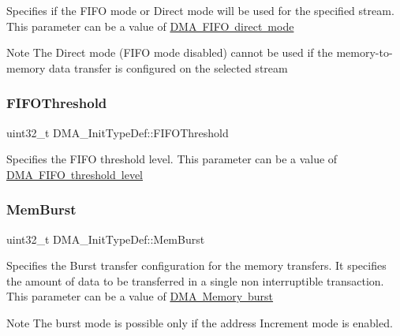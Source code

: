 Specifies if the F\+I\+FO mode or Direct mode will be used for the specified stream. This parameter can be a value of \mbox{\hyperlink{group___d_m_a___f_i_f_o__direct__mode}{D\+MA F\+I\+FO direct mode}} \begin{DoxyNote}{Note}
The Direct mode (F\+I\+FO mode disabled) cannot be used if the memory-\/to-\/memory data transfer is configured on the selected stream 
\end{DoxyNote}
\mbox{\label{struct_d_m_a___init_type_def_a2f994cc2979b82cd215e9f38edbbc6ed}} 
\subsubsection{\texorpdfstring{FIFOThreshold}{FIFOThreshold}}
{\footnotesize\ttfamily uint32\+\_\+t D\+M\+A\+\_\+\+Init\+Type\+Def\+::\+F\+I\+F\+O\+Threshold}

Specifies the F\+I\+FO threshold level. This parameter can be a value of \mbox{\hyperlink{group___d_m_a___f_i_f_o__threshold__level}{D\+MA F\+I\+FO threshold level}} \mbox{\label{struct_d_m_a___init_type_def_ad5e266a0b90f58365e21c349654bc68d}} 
\subsubsection{\texorpdfstring{MemBurst}{MemBurst}}
{\footnotesize\ttfamily uint32\+\_\+t D\+M\+A\+\_\+\+Init\+Type\+Def\+::\+Mem\+Burst}

Specifies the Burst transfer configuration for the memory transfers. It specifies the amount of data to be transferred in a single non interruptible transaction. This parameter can be a value of \mbox{\hyperlink{group___d_m_a___memory__burst}{D\+MA Memory burst}} \begin{DoxyNote}{Note}
The burst mode is possible only if the address Increment mode is enabled. 
\end{DoxyNote}
\mbox{\label{struct_d_m_a___init_type_def_a7784efedc4a61325fa7364fcace10136}} 

